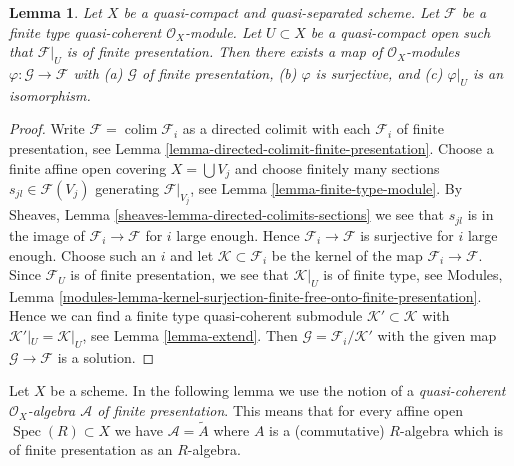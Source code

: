 \documentclass{stacks-project}
\theoremstyle{plain}
\newtheorem{lemma}[subsection]{Lemma}
\theoremstyle{definition}
\theoremstyle{remark}
\numberwithin{equation}{subsection}
\def\colim{\mathop{\mathrm{colim}}\nolimits}
\def\Spec{\mathop{\mathrm{Spec}}}
\begin{document}
\begin{lemma}
\label{lemma-application-directed-colimit}
Let $X$ be a quasi-compact and quasi-separated scheme.
Let $\mathcal{F}$ be a finite type quasi-coherent $\mathcal{O}_X$-module.
Let $U \subset X$ be a quasi-compact open such that $\mathcal{F}|_U$
is of finite presentation. Then there exists a map of $\mathcal{O}_X$-modules
$\varphi : \mathcal{G} \to \mathcal{F}$ with
(a) $\mathcal{G}$ of finite presentation,
(b) $\varphi$ is surjective, and
(c) $\varphi|_U$ is an isomorphism.
\end{lemma}

\begin{proof}
Write $\mathcal{F} = \colim \mathcal{F}_i$ as a directed colimit
with each $\mathcal{F}_i$ of finite presentation,
see Lemma \ref{lemma-directed-colimit-finite-presentation}.
Choose a finite affine open covering $X = \bigcup V_j$ and choose
finitely many sections $s_{jl} \in \mathcal{F}(V_j)$ generating
$\mathcal{F}|_{V_j}$, see Lemma \ref{lemma-finite-type-module}.
By Sheaves, Lemma \ref{sheaves-lemma-directed-colimits-sections}
we see that $s_{jl}$ is in the image of $\mathcal{F}_i \to \mathcal{F}$
for $i$ large enough. Hence $\mathcal{F}_i \to \mathcal{F}$ is surjective
for $i$ large enough. Choose such an $i$ and let
$\mathcal{K} \subset \mathcal{F}_i$ be the kernel of the map
$\mathcal{F}_i \to \mathcal{F}$. Since $\mathcal{F}_U$ is of finite
presentation, we see that $\mathcal{K}|_U$ is of finite type, see
Modules, Lemma
\ref{modules-lemma-kernel-surjection-finite-free-onto-finite-presentation}.
Hence we can find a finite type quasi-coherent submodule
$\mathcal{K}' \subset \mathcal{K}$ with $\mathcal{K}'|_U = \mathcal{K}|_U$,
see Lemma \ref{lemma-extend}. Then
$\mathcal{G} = \mathcal{F}_i/\mathcal{K}'$
with the given map $\mathcal{G} \to \mathcal{F}$ is a solution.
\end{proof}

\noindent
Let $X$ be a scheme. In the following lemma we use the notion
of a {\it quasi-coherent $\mathcal{O}_X$-algebra $\mathcal{A}$
of finite presentation}. This means that for every affine open
$\Spec(R) \subset X$ we have $\mathcal{A} = \widetilde{A}$
where $A$ is a (commutative) $R$-algebra which is of finite presentation
as an $R$-algebra.
\end{document}
